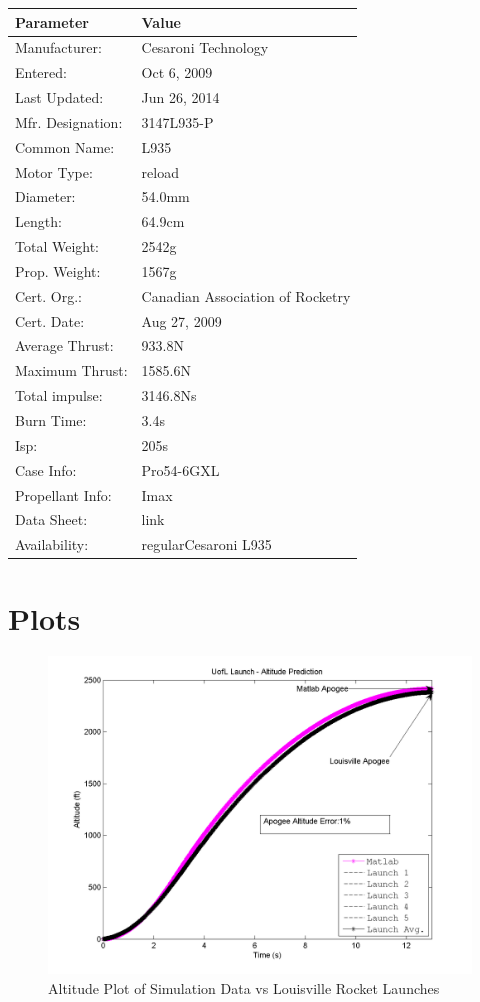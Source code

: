 \documentclass[]{book}
\begin{document}
\begin{longtable}[c]{@{}ll@{}}
\toprule
Parameter & Value\tabularnewline
\midrule
\endhead
Manufacturer: & Cesaroni Technology\tabularnewline
Entered: & Oct 6, 2009\tabularnewline
Last Updated: & Jun 26, 2014\tabularnewline
Mfr. Designation: & 3147L935-P\tabularnewline
Common Name: & L935\tabularnewline
Motor Type: & reload\tabularnewline
Diameter: & 54.0mm\tabularnewline
Length: & 64.9cm\tabularnewline
Total Weight: & 2542g\tabularnewline
Prop. Weight: & 1567g\tabularnewline
Cert. Org.: & Canadian Association of Rocketry\tabularnewline
Cert. Date: & Aug 27, 2009\tabularnewline
Average Thrust: & 933.8N\tabularnewline
Maximum Thrust: & 1585.6N\tabularnewline
Total impulse: & 3146.8Ns\tabularnewline
Burn Time: & 3.4s\tabularnewline
Isp: & 205s\tabularnewline
Case Info: & Pro54-6GXL\tabularnewline
Propellant Info: & Imax\tabularnewline
Data Sheet: & link\tabularnewline
Availability: & regularCesaroni L935\tabularnewline
\bottomrule
\end{longtable}

\clearpage

\section{Plots}\label{plots}

\begin{figure}[htbp]
\centering
\includegraphics{images/plots/plot_louisville_altitude_analysis.png}
\caption{Altitude Plot of Simulation Data vs Louisville Rocket Launches
\label{experimental_comparison_altitude_label}}
\end{figure}
\end{document}
